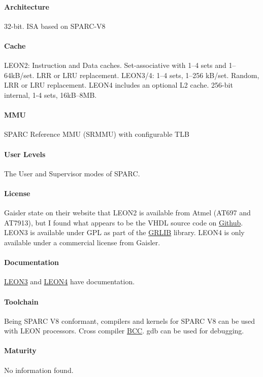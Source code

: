 \paragraph{Architecture} 32-bit. ISA based on SPARC-V8
\paragraph{Cache} LEON2: Instruction and Data caches. Set-associative with 1--4 sets and 1--64kB/set. LRR or LRU replacement. LEON3/4: 1--4 sets, 1--256 kB/set. Random, LRR or LRU replacement. LEON4 includes an optional L2 cache. 256-bit internal, 1-4 sets, 16kB--8MB.
\paragraph{MMU} SPARC Reference MMU (SRMMU) with configurable TLB
\paragraph{User Levels} The User and Supervisor modes of SPARC.
\paragraph{License} Gaisler state on their website that LEON2 is available from Atmel (AT697 and AT7913), but I found what appears to be the VHDL source code on \href{https://github.com/Galland/LEON2}{Github}. LEON3 is available under GPL as part of the \href{http://www.gaisler.com/index.php/products/ipcores/soclibrary}{GRLIB} library. LEON4 is only available under a commercial license from Gaisler.
\paragraph{Documentation} \href{http://www.gaisler.com/doc/leon3_product_sheet.pdf}{LEON3} and \href{http://www.gaisler.com/doc/LEON4_32-bit_processor_core.pdf}{LEON4} have documentation.
\paragraph{Toolchain} Being SPARC V8 conformant, compilers and kernels for SPARC V8 can be used with LEON processors. Cross compiler \href{http://www.gaisler.com/index.php/products?option=com_content&task=view&id=147}{BCC}. gdb can be used for debugging.
\paragraph{Maturity} No information found.

